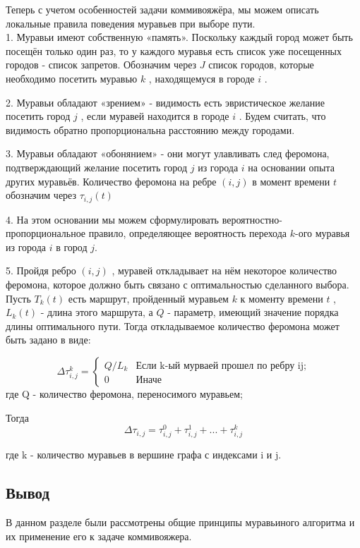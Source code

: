 \documentclass[a4paper, 12pt]{article}
\begin{document}
	Теперь с учетом особенностей задачи коммивояжёра, мы можем описать локальные правила поведения муравьев при выборе пути.\\
	
	1. Муравьи имеют собственную «память». Поскольку каждый город может быть посещён только один раз, то у каждого муравья есть список уже посещенных городов - список запретов. Обозначим через $J$ список городов, которые необходимо посетить муравью $k$ , находящемуся в городе $i$ . 
	
	2. Муравьи обладают «зрением» - видимость есть эвристическое желание посетить город $j$ , если муравей находится в городе $i$ . Будем считать, что видимость обратно пропорциональна расстоянию между городами. 
	
	3. Муравьи обладают «обонянием» - они могут улавливать след феромона, подтверждающий желание посетить город $j$ из города $i$ на основании опыта других муравьёв. Количество феромона на ребре $(i,j)$ в момент времени $t$ обозначим через  $\tau _{i,j} (t)$ 
	
	4. На этом основании мы можем сформулировать вероятностно-пропорциональное правило, определяющее вероятность перехода $k$-ого муравья из города $i$  в город $j$. 
	
	5. Пройдя ребро $(i,j)$ , муравей откладывает на нём некоторое количество феромона, которое должно быть связано с оптимальностью сделанного выбора. Пусть $T _{k} (t)$ есть маршрут, пройденный муравьем $k$ к моменту времени $t$ , $L _{k} (t)$ - длина этого маршрута, а $Q$ - параметр, имеющий значение порядка длины оптимального пути. Тогда откладываемое количество феромона может быть задано в виде:
	
	\begin{equation}\label{form:add} 
		{\displaystyle \Delta \tau _{i,j}^k={\begin{cases}Q/L_{k}& {\mbox{Если k-ый мурваей прошел по ребру ij;}}\\0&{\mbox{Иначе}}\end{cases}}}
	\end{equation}
	где \quad Q - количество феромона, переносимого муравьем;
	
	Тогда
	\begin{equation}\label{form:add1} 
		\Delta \tau _{i,j}= \tau _{i,j}^0 + \tau _{i,j}^1 + ... + \tau _{i,j}^k 
	\end{equation}
	
	где k - количество муравьев в вершине графа с индексами i и j.
	\subsection{Вывод}
	\hspace*{5mm} В данном разделе были рассмотрены общие принципы муравьиного алгоритма и их применение его к задаче коммивояжера. 
\end{document}
